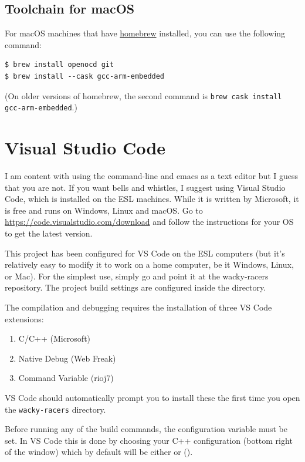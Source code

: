 \subsection{Toolchain for macOS}

For macOS machines that have \href{https://brew.sh}{homebrew}
installed, you can use the following command:

\begin{verbatim}
$ brew install openocd git
$ brew install --cask gcc-arm-embedded
\end{verbatim}

(On older versions of homebrew, the second command is
\verb|brew cask install gcc-arm-embedded|.)


\section{Visual Studio Code}
\label{vs-code}

I am content with using the command-line and emacs as a text editor but
I guess that you are not.  If you want bells and whistles, I suggest
using Visual Studio Code, which is installed on the ESL machines.  While
it is written by Microsoft, it is free and runs on Windows, Linux and
macOS. Go to \url{https://code.visualstudio.com/download} and follow the
instructions for your OS to get the latest version.

This project has been configured for VS Code on the ESL computers (but
it's relatively easy to modify it to work on a home computer, be it
Windows, Linux, or Mac). For the simplest use, simply go  and point it at the wacky-racers repository. The project
build settings are configured inside the  directory.

The compilation and debugging requires the installation of three VS Code
extensions:
\begin{enumerate}
\item C/C++ (Microsoft)
\item Native Debug (Web Freak)
\item Command Variable (rioj7)
\end{enumerate}
VS Code should automatically prompt you to install these the first time
you open the \verb|wacky-racers| directory.

Before running any of the build commands, the  configuration
variable must be set. In VS Code this is done by choosing your C++
configuration (bottom right of the window) which by default will be
either  or  ().

